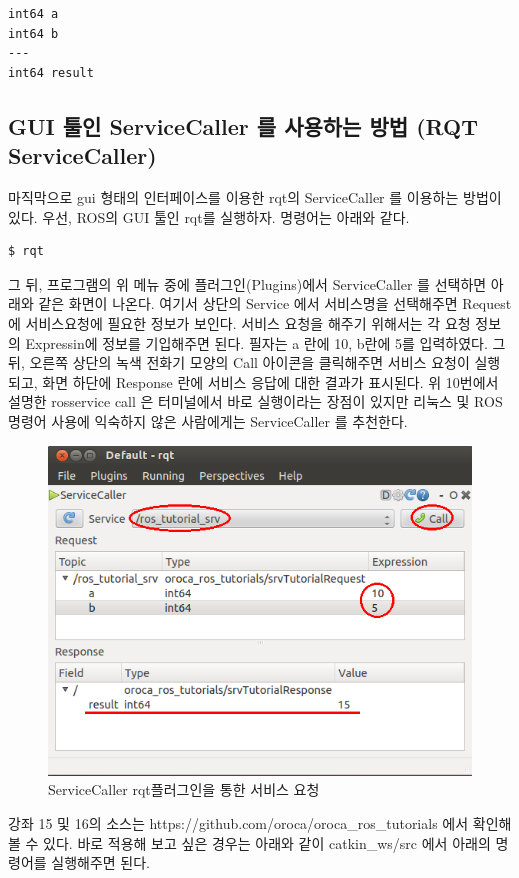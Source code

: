 \begin{lstlisting}[language=ROS]
int64 a
int64 b
---
int64 result
\end{lstlisting}

\subsection{GUI 툴인 ServiceCaller 를 사용하는 방법 (RQT ServiceCaller)}

마직막으로 gui 형태의 인터페이스를 이용한 rqt의 ServiceCaller 를 이용하는 방법이 있다. 우선, ROS의 GUI 툴인 rqt를 실행하자. 명령어는 아래와 같다.

\begin{lstlisting}[language=ROS]
$ rqt
\end{lstlisting}

그 뒤, 프로그램의 위 메뉴 중에 플러그인(Plugins)에서 ServiceCaller 를 선택하면 아래와 같은 화면이 나온다. 여기서 상단의 Service 에서 서비스명을 선택해주면 Request 에 서비스요청에 필요한 정보가 보인다. 서비스 요청을 해주기 위해서는 각 요청 정보의 Expressin에 정보를 기입해주면 된다. 필자는 a 란에 10, b란에 5를 입력하였다. 그 뒤, 오른쪽 상단의 녹색 전화기 모양의 Call 아이콘을 클릭해주면 서비스 요청이 실행되고, 화면 하단에 Response 란에 서비스 응답에 대한 결과가 표시된다. 위 10번에서 설명한 rosservice call 은 터미널에서 바로 실행이라는 장점이 있지만 리눅스 및 ROS 명령어 사용에 익숙하지 않은 사람에게는 ServiceCaller 를 추천한다.

\begin{figure}[h]
\centering\includegraphics[width=0.7\columnwidth]{pictures/chapter7/rqt_service_caller.png}
\caption{ServiceCaller rqt플러그인을 통한 서비스 요청}
\end{figure}

강좌 15 및 16의 소스는 https://github.com/oroca/oroca\_ros\_tutorials 에서 확인해 볼 수 있다. 바로 적용해 보고 싶은 경우는 아래와 같이 catkin\_ws/src 에서 아래의 명령어를 실행해주면 된다.

